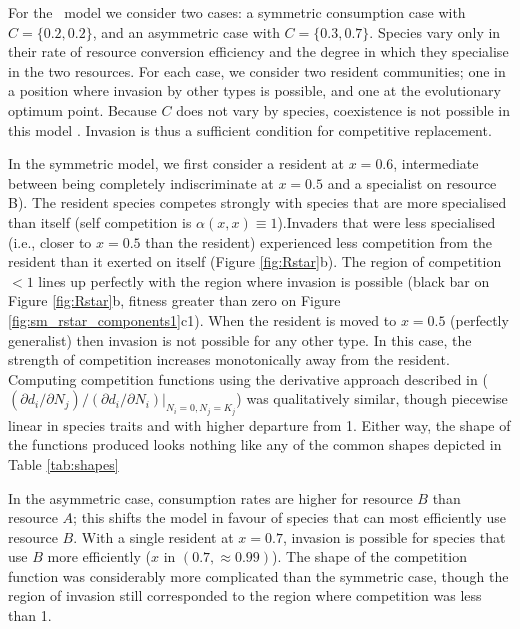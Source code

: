 \documentclass[a4paper,11pt]{article}
\begin{document}
For the \Rstar\ model we consider two cases: a symmetric
consumption case with $C = \{0.2, 0.2\}$, and an asymmetric case
with $C = \{0.3, 0.7\}$.  Species vary only in their rate of resource
conversion efficiency and the degree in which they specialise in the
two resources.  For each case, we consider two resident communities;
one in a position where invasion by other types is possible, and one at
the evolutionary optimum point.
%
Because $C$ does not vary by species, coexistence is not possible in
this model \citep{Tilman-1982}. Invasion is thus a sufficient condition for
competitive replacement.

In the symmetric model, we first consider a resident at $x = 0.6$,
intermediate between being completely indiscriminate at $x=0.5$ and a
specialist on resource B).
The resident species competes strongly with species that are more
specialised than itself (self competition is $\alpha(x, x) \equiv
1$).Invaders that were less specialised (i.e., closer to $x =
0.5$ than the resident) experienced less competition from the resident
than it exerted on itself (Figure \ref{fig:Rstar}b).
%
The region of competition $< 1$ lines up perfectly with the region
where invasion is possible (black bar on Figure \ref{fig:Rstar}b,
fitness greater than zero on Figure
\ref{fig:sm_rstar_components1}c1).
%
When the resident is moved to $x = 0.5$ (perfectly generalist) then
invasion is not possible for any other type.  In this case, the strength of
competition increases monotonically away from the resident.
%
Computing competition functions using the derivative approach
described in \citet{Abrams-2008}
($(\partial d_i / \partial N_j) / (\partial d_i / \partial N_i) |_{N_i
  = 0, N_j = K_j}$)
was qualitatively similar, though piecewise linear in species traits
and with higher departure from 1.
Either way, the shape of the functions produced looks nothing like any of the
common shapes depicted in Table \ref{tab:shapes}

In the asymmetric case, consumption rates are higher for
resource $B$ than resource $A$; this shifts the model in favour of
species that can most efficiently use resource $B$.
%
With a single resident at $x = 0.7$, invasion is possible for species
that use $B$ more efficiently ($x$ in $(0.7, \approx 0.99)$).
%
The shape of the competition function was considerably more
complicated than the symmetric case, though the region of invasion
still corresponded to the region where competition was less than 1.
\end{document}

